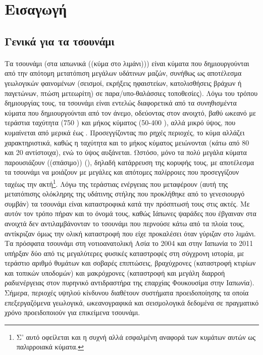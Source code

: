 \section{Εισαγωγή}
\subsection{\texorpdfstring{Γενικά για τα τσουνάμι}{}}
\paragraph{} Τα τσουνάμι (στα ιαπωνικά ((κύμα στο λιμάνι))) είναι κύματα που
δημιουργούνται από την απότομη μετατόπιση μεγάλων υδάτινων μαζών, συνήθως ως αποτέλεσμα
γεωλογικών φαινομένων (σεισμοί, εκρήξεις ηφαιστείων, κατολισθήσεις βράχων ή παγετώνων,
πτώση μετεωρίτη) σε παρα/υπο-θαλάσσιες τοποθεσίες). Λόγω του τρόπου δημιουργίας τους, τα
τσουνάμι είναι εντελώς διαφορετικά από τα συνηθισμέντα κύματα που δημιουργούνται από τον
άνεμο, οδεύοντας στον ανοιχτό, βαθύ ωκεανό με τεράστια ταχύτητα (750 ) και μήκος
κύματος (50-400 ), αλλά μικρό ύψος, που κυμαίνεται από μερικά  έως
. Προσεγγίζοντας πιο ρηχές περιοχές, το κύμα αλλάζει χαρακτηριστικά, καθώς η
ταχύτητα και το μήκος κύματος μειώνονται (κάτω από 80  και 20 
αντίστοιχα), ενώ το ύψος αυξάνεται. Ωστόσο, μόνο τα πολύ μεγάλα κύματα παρουσιάζουν
((σπάσιμο)) (), δηλαδή κατάρρευση της κορυφής τους, με αποτέλεσμα τα
τσουνάμι να μοιάζουν με μεγάλες και απότομες παλίρροιες που προσεγγίζουν ταχέως την
ακτή\footnote{Σ' αυτό οφείλεται και η συχνή αλλά εσφαλμένη αναφορά των κυμάτων αυτών ως
  παλιρροιακά κύματα.}. Λόγω της τεράστιας ενέργειας που μεταφέρουν (αυτή της μετατόπισης
ολόκληρης της υδάτινης στήλης που προκλήθηκε από το γενεσιουργό συμβάν) τα τσουνάμι είναι
καταστροφικά κατά την πρόσπτωσή τους στις ακτές. Με αυτόν τον τρόπο πήραν και το όνομά
τους, καθώς Ιάπωνες ψαράδες που έβγαιναν στα ανοιχτά δεν αντιλαμβάνονταν το τσουνάμι που
περνούσε κάτω από τα πλοία τους, αντίκριζαν όμως την ολική καταστροφή που είχε προκαλέσει
όταν γύριζαν στο λιμάνι. Τα πρόσφατα τσουνάμι στη νοτιοανατολική Ασία το 2004 και στην
Ιαπωνία το 2011 υπήρξαν δύο από τις μεγαλύτερες φυσικές καταστροφές στη σύγχρονη ιστορία,
με τεράστιο αριθμό θυμάτων και σοβαρές επιπτώσεις, βραχύχρονες (καταστροφή κτιρίων και
τοπικών υποδομών) και μακρόχρονες (καταστροφή και μεγάλη διαρροή ραδιενέργειας στον
πυρηνικό αντιδραστήρα της επαρχίας Φουκουσίμα στην Ιαπωνία). Σήμερα, περιοχές υψηλού
κίνδυνου διαθέτουν συστήματα προειδοποίησης τα οποία επεξεργαζόμενα γεωλογικά,
ωκεανογραφικά και σεισμολογικά δεδομένα σε πραγματικό χρόνο προειδοποιούν για επικείμενα
τσουνάμι.

